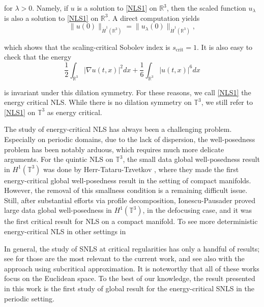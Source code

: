 \documentclass[letterpaper, 11pt,  reqno]{amsart}
\newcommand{\1}{\hspace{0.5mm}\text{I}\hspace{0.5mm}}
\newcommand{\noi}{\noindent}
\newcommand{\R}{\mathbb{R}}
\newcommand{\T}{\mathbb{T}}
\newcommand{\nb}{\nabla}
\newcommand{\ld}{\lambda}
\numberwithin{equation}{section}
\numberwithin{theorem}{section}
\begin{document}
\noi
for $\ld >0$. Namely, if $u$ is a solution to \eqref{NLS1} on $\R^3$, then the scaled function $u_\ld$ is also a solution to \eqref{NLS1} on $\R^3$.
A direct computation yields
\[
\| u(0) \|_{\dot H^1(\R^3)} =\| u_\ld (0) \|_{\dot H^1(\R^3)},
\]


\noi
which shows that the
scaling-critical Sobolev index is $ s_\text{crit} = 1$.
It is also easy to check that 
the energy
\[
\frac 12 \int_{\R^3} |\nb u(t, x)|^2 dx
+ \frac{1}{6} \int_{\R^3} |u(t, x)|^6 dx
\]



\noi
is invariant under 
this dilation symmetry.
For these reasons,
we call \eqref{NLS1} the energy critical NLS.
While there is no dilation symmetry on $\T^3$, 
we still refer to \eqref{NLS1} on $\T^3$ as energy critical.


 



The study of energy-critical NLS has always been a challenging problem. 
Especially on periodic domains, 
due to the lack of dispersion,
the well-posedness problem has been notably arduous, which requires much more delicate arguments. 
For the quintic NLS on $\T^3$, 
the  small data global well-posedness result in $H^1(\T^3)$ was done by 
Herr-Tataru-Tzvetkov \cite{HTT11},
where they made the first  energy-critical global well-posedness result in 
the setting of compact manifolds.
However, the removal of this smallness condition 
 is a remaining difficult issue. 
Still, after substantial efforts via
 profile decomposition, Ionescu-Pausader \cite{IP12}
 proved large data global well-posedness in $H^1(\T^3)$,
 in the defocusing case, and it was the first critical result for NLS on a compact manifold.
To see more deterministic energy-critical NLS in other settings in
\cite{BO99, CKSTT08, IP12b,KM06, KV10, KV12, RV07, V07, Y21}



In general, the study of SNLS at critical regularities has only a handful of results; see
\cite{BOP15, CL22, OO20, OOP19} for those are the most relevant to the current work, 
and see also \cite{FX19, FX21} with the approach using subcritical approximation. 
It is noteworthy that all of these works focus on the Euclidean space. 
To the best of our knowledge,
the result presented in this work is the first study of
global result for the energy-critical SNLS in the periodic setting.
\end{document}
